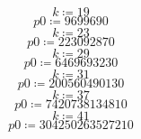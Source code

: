 \documentclass{article}
\begin{document}
\vspace{-\bigskipamount}
\begin{dmath*}
k \coloneqq 19
\end{dmath*}
\vspace{-\bigskipamount}
\begin{dmath*}
\mathit{p0} \coloneqq 9699690
\end{dmath*}
\vspace{-\bigskipamount}
\begin{dmath*}
k \coloneqq 23
\end{dmath*}
\vspace{-\bigskipamount}
\begin{dmath*}
\mathit{p0} \coloneqq 223092870
\end{dmath*}
\vspace{-\bigskipamount}
\begin{dmath*}
k \coloneqq 29
\end{dmath*}
\vspace{-\bigskipamount}
\begin{dmath*}
\mathit{p0} \coloneqq 6469693230
\end{dmath*}
\vspace{-\bigskipamount}
\begin{dmath*}
k \coloneqq 31
\end{dmath*}
\vspace{-\bigskipamount}
\begin{dmath*}
\mathit{p0} \coloneqq 200560490130
\end{dmath*}
\vspace{-\bigskipamount}
\begin{dmath*}
k \coloneqq 37
\end{dmath*}
\vspace{-\bigskipamount}
\begin{dmath*}
\mathit{p0} \coloneqq 7420738134810
\end{dmath*}
\vspace{-\bigskipamount}
\begin{dmath*}
k \coloneqq 41
\end{dmath*}
\vspace{-\bigskipamount}
\begin{dmath*}
\mathit{p0} \coloneqq 304250263527210
\end{dmath*}
\vspace{-\bigskipamount}
\end{document}
